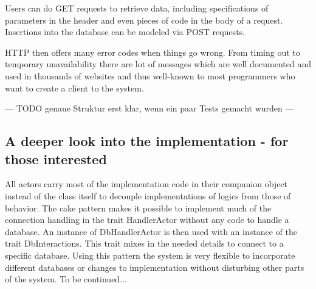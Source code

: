 \documentclass[twoside, 11pt]{scrartcl}
\begin{document}
Users can do GET requests to retrieve data, including specifications of parameters in the header and even pieces of code in the body of a request. Insertions into the database can be modeled via POST requests. 

HTTP then offers many error codes when things go wrong. From timing out to temporary unavailability there are lot of messages which are well documented and used in thousands of websites and thus well-known to most programmers who want to create a client to the system.

--- TODO  genaue Struktur erst klar, wenn ein paar Tests gemacht wurden ---



\subsection{A deeper look into the implementation - for those interested}
All actors carry most of the implementation code in their companion object instead of the class itself to decouple implementations of logics from those of behavior. The cake pattern \cite{link:cakePattern} makes it possible to implement much of the connection handling in the trait HandlerActor without any code to handle a database.  An instance of DbHandlerActor is then used with an instance of the trait DbInteractions. This trait mixes in the needed details to connect to a specific database. Using this pattern the system is very flexible to incorporate different databases or changes to implementation without disturbing other parts of the system. To be continued...
\end{document}
